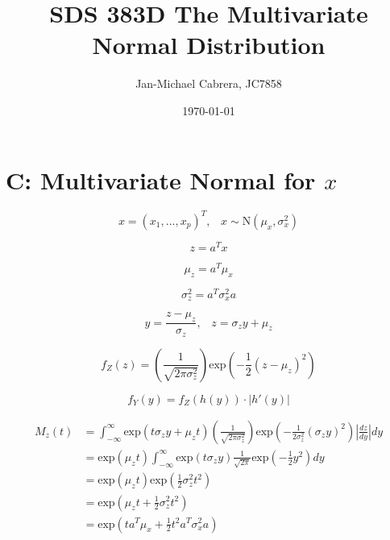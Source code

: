 \documentclass[12pt]{article}
\begin{document}
    \title{SDS 383D The Multivariate Normal Distribution}
    \author{Jan-Michael Cabrera, JC7858}
    \date{\today}
    \maketitle

    \section*{C: Multivariate Normal for $x$}

        \begin{equation}
            x = (x_1,...,x_p)^T, \hspace{10pt} x\sim\text{N}(\mu_x, \sigma_x^2)
        \end{equation}

        \begin{equation}
            z = a^Tx
        \end{equation}

        \begin{equation}
            \mu_z = a^T \mu_x
        \end{equation}

        \begin{equation}
            \sigma_z^2 = a^T \sigma_x^2 a
        \end{equation}

        \begin{equation}
            y = \frac{z - \mu_z}{\sigma_z}, \hspace{10pt} z = \sigma_z y + \mu_z
        \end{equation}

        \begin{equation}
            f_Z(z) = \left( \frac{1}{\sqrt{2 \pi \sigma_z^2}}\right) \text{exp}\left ( -\frac{1}{2} (z - \mu_z)^2\right)
        \end{equation}

        \begin{equation}
            f_Y(y) = f_Z(h(y)) \cdot |h'(y)|
        \end{equation}

        \begin{align}
            M_z(t) &= \int_{-\infty}^{\infty} \text{exp}(t \sigma_z y + \mu_z t) \left( \frac{1}{\sqrt{2 \pi \sigma_z^2}}\right) \text{exp}\left ( -\frac{1}{2 \sigma_z^2} (\sigma_z y)^2\right) \left | \frac{dz}{dy}\right | dy \\
            & = \text{exp}(\mu_z t) \int_{-\infty}^{\infty} \text{exp}(t \sigma_z y) \frac{1}{\sqrt{2 \pi}}\text{exp}\left( - \frac{1}{2} y^2 \right) dy \\
            &= \text{exp}(\mu_z t) \text{exp}\left ( \frac{1}{2} \sigma_z^2 t^2\right) \\
            & = \text{exp}\left ( \mu_z t + \frac{1}{2} \sigma_z^2 t^2\right) \\
            &= \text{exp}\left( t a^T \mu_x + \frac{1}{2}t^2 a^T \sigma_x^2 a\right)
        \end{align}
\end{document}
